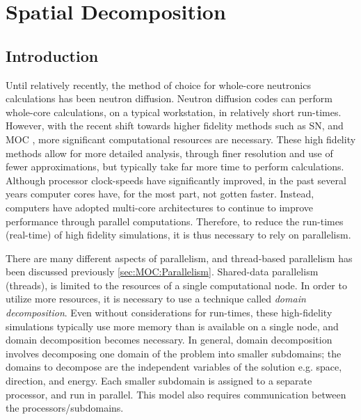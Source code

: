 \chapter{Spatial Decomposition}{\label{ch:Spatial Decomposition}
  \def\figpath{chapters/SpatialDecomposition/figures/}
  \graphicspath{ {\figpath} }
  \newcommand{\resultwidth}{0.85\linewidth}
  \section{Introduction}{\label{sec:Spatial Decomposition:Introduction}
    Until relatively recently, the method of choice for whole-core neutronics calculations has been neutron diffusion.
    Neutron diffusion codes can perform whole-core calculations, on a typical workstation, in relatively short run-times.
    However, with the recent shift towards higher fidelity methods such as \ac{SN}, and \ac{MOC} \cite{Askew1972}, more significant computational resources are necessary.
    These high fidelity methods allow for more detailed analysis, through finer resolution and use of fewer approximations, but typically take far more time to perform calculations.
    Although processor clock-speeds have significantly improved, in the past several years computer cores have, for the most part, not gotten faster.
    Instead, computers have adopted multi-core architectures to continue to improve performance through parallel computations.
    Therefore, to reduce the run-times (real-time) of high fidelity simulations, it is thus necessary to rely on parallelism.

    There are many different aspects of parallelism, and thread-based parallelism has been discussed previously \cref{sec:MOC:Parallelism}.
    Shared-data parallelism (threads), is limited to the resources of a single computational node.
    In order to utilize more resources, it is necessary to use a technique called \emph{domain decomposition}.
    Even without considerations for run-times, these high-fidelity simulations typically use more memory than is available on a single node, and domain decomposition becomes necessary.
    In general, domain decomposition involves decomposing one domain of the problem into smaller subdomains; the domains to decompose are the independent variables of the solution e.g. space, direction, and energy.
    Each smaller subdomain is assigned to a separate processor, and run in parallel.
    This model also requires communication between the processors/subdomains.

}}
